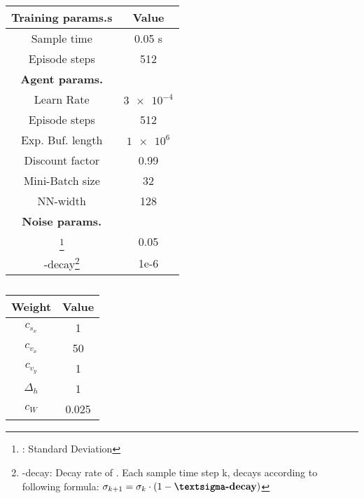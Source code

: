 {\def\arraystretch{1.4}\tabcolsep=5pt
	
	\begin{table}[h!]
		\parbox{.4\linewidth}{
			\centering
			\begin{tabular}{| c | c |} 
				\hline
				\textbf{Training params.s} & \textbf{Value} \\ [0.5ex] 
				\hline
				\hline
				Sample time & 0.05 s \\ 
				
				Episode steps & 512 \\
				
				\hline
				\textbf{Agent params.} &  \\ [0.5ex] 
				\hline
				
				Learn Rate & $\num{3e-4}$ \\
				
				Episode steps & 512 \\
				
				Exp. Buf. length & $\num{1e6}$ \\
				
				Discount factor &  0.99 \\
				
				Mini-Batch size & 32 \\
				
				NN-width & 128 \\
				
				\hline
				\textbf{Noise params.} &  \\ [0.5ex] 
				\hline
				
				\textsigma\footnote{\textsigma: Standard Deviation} & 0.05 \\
				
				\textsigma-decay\footnote{\textsigma-decay: Decay rate of \textsigma. Each sample time step k, \textsigma decays according to following formula: $\sigma_{k+1} = \sigma_k \cdot (1 - \textbf{\textsigma-decay})$} & 1e-6 \\
				
				\hline
			\end{tabular}	
			\caption[DDPG agent parameters]{}
			\label{table:DDPG parameters}
		}
	\end{table}
}

{\def\arraystretch{1.4}\tabcolsep=5pt
	\begin{table}[h!]
		\centering
		\begin{tabular}{| c | c |}
			\hline
			\textbf{Weight} & \textbf{Value}\\
			\hline
			\hline
			$c_{s_x}$   		&  1	\\
			$c_{v_x}$   	    &  50	\\
			$c_{v_y}$  		    &  1	\\
			$\Delta_h$  		&  1	\\
			$c_W$ 				&  0.025\\
			\hline
		\end{tabular}
		\caption[Reward weights]{}
		\label{table: Reward weights}
	\end{table}
}



